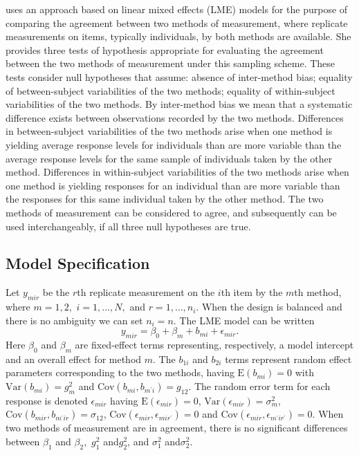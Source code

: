 \documentclass[12pt, a4paper]{report}
\theoremstyle{plain}
\theoremstyle{definition}
\theoremstyle{remark}
\begin{document}
	\citet{AARoy20092009} uses an approach based on linear mixed effects (LME) models for the purpose of comparing the agreement between two methods of measurement, where replicate measurements on items, typically individuals, by both methods are available. She provides three tests of hypothesis appropriate for evaluating the agreement between the two methods of measurement under this sampling scheme. These tests consider null hypotheses that assume: absence of inter-method bias; equality of between-subject variabilities of the two methods; equality of within-subject variabilities of the two methods. By inter-method bias we mean that a systematic difference exists between observations recorded by the two methods. Differences in between-subject variabilities of the two methods arise when one method is yielding average response levels for individuals than are more variable than the average response levels for the same sample of individuals taken by the other method.  Differences in within-subject variabilities of the two methods arise when one method is yielding responses for an individual than are more variable than the responses for this same individual taken by the other method. The two methods of measurement can be considered to agree, and subsequently can be used interchangeably, if all three null hypotheses are true.
	
	\subsection{Model Specification}
	Let $y_{mir} $ be the $r$th replicate measurement on the $i$th item by the $m$th method, where $m=1,2,$ $i=1,\ldots,N,$ and $r = 1,\ldots,n_i.$ When the design is balanced and there is no ambiguity we can set $n_i=n.$ The LME model can be written
	\begin{equation}
	y_{mir} = \beta_{0} + \beta_{m} + b_{mi} + \epsilon_{mir}.
	\end{equation}
	Here $\beta_0$ and $\beta_m$ are fixed-effect terms representing, respectively, a model intercept and an overall effect for method $m.$ The $b_{1i}$ and $b_{2i}$ terms represent random effect parameters corresponding to the two methods, having $\mathrm{E}(b_{mi})=0$ with $\mathrm{Var}(b_{mi})=g^2_m$ and $\mathrm{Cov}(b_{mi}, b_{m^\prime i})=g_{12}.$ The random error term for each response is denoted $\epsilon_{mir}$ having $\mathrm{E}(\epsilon_{mir})=0$, $\mathrm{Var}(\epsilon_{mir})=\sigma^2_m$, $\mathrm{Cov}(b_{mir}, b_{m^\prime ir})=\sigma_{12}$, $\mathrm{Cov}(\epsilon_{mir}, \epsilon_{mir^\prime})= 0$ and $\mathrm{Cov}(\epsilon_{mir}, \epsilon_{m^\prime ir^\prime})= 0.$
	When two methods of measurement are in agreement, there is no significant differences between $\beta_1$ and $\beta_2,$ $g^2_1 $ and$ g^2_2$, and $\sigma^2_1 $ and$ \sigma^2_2$.
	\bigskip
	
\end{document}
